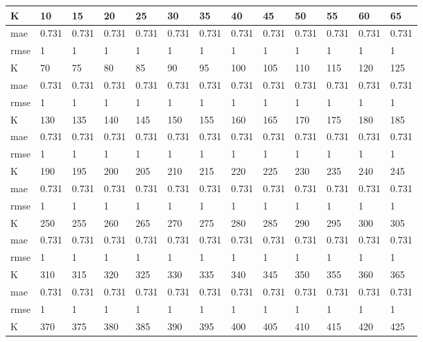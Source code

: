 \begin{appendices}
\begin{center} \label{tab20}
	\begin{tabularx}{\textwidth}{|l|X|X|X|X|X|X|X|X|X|X|X|X|} 
		\hline 
		K & 10 & 15 & 20 & 25 & 30 & 35 & 40 & 45 & 50 & 55 & 60 & 65 \\ \hline 
		mae & 0.731 & 0.731 & 0.731 & 0.731 & 0.731 & 0.731 & 0.731 & 0.731 & 0.731 & 0.731 & 0.731 & 0.731 \\ \hline 
		rmse & 1 & 1 & 1 & 1 & 1 & 1 & 1 & 1 & 1 & 1 & 1 & 1 \\ \hline 
		\hline 
		K & 70 & 75 & 80 & 85 & 90 & 95 & 100 & 105 & 110 & 115 & 120 & 125 \\ \hline 
		mae & 0.731 & 0.731 & 0.731 & 0.731 & 0.731 & 0.731 & 0.731 & 0.731 & 0.731 & 0.731 & 0.731 & 0.731 \\ \hline 
		rmse & 1 & 1 & 1 & 1 & 1 & 1 & 1 & 1 & 1 & 1 & 1 & 1 \\ \hline 
		\hline 
		K & 130 & 135 & 140 & 145 & 150 & 155 & 160 & 165 & 170 & 175 & 180 & 185 \\ \hline 
		mae & 0.731 & 0.731 & 0.731 & 0.731 & 0.731 & 0.731 & 0.731 & 0.731 & 0.731 & 0.731 & 0.731 & 0.731 \\ \hline 
		rmse & 1 & 1 & 1 & 1 & 1 & 1 & 1 & 1 & 1 & 1 & 1 & 1 \\ \hline 
		\hline 
		K & 190 & 195 & 200 & 205 & 210 & 215 & 220 & 225 & 230 & 235 & 240 & 245 \\ \hline 
		mae & 0.731 & 0.731 & 0.731 & 0.731 & 0.731 & 0.731 & 0.731 & 0.731 & 0.731 & 0.731 & 0.731 & 0.731 \\ \hline 
		rmse & 1 & 1 & 1 & 1 & 1 & 1 & 1 & 1 & 1 & 1 & 1 & 1 \\ \hline 
		\hline 
		K & 250 & 255 & 260 & 265 & 270 & 275 & 280 & 285 & 290 & 295 & 300 & 305 \\ \hline 
		mae & 0.731 & 0.731 & 0.731 & 0.731 & 0.731 & 0.731 & 0.731 & 0.731 & 0.731 & 0.731 & 0.731 & 0.731 \\ \hline 
		rmse & 1 & 1 & 1 & 1 & 1 & 1 & 1 & 1 & 1 & 1 & 1 & 1 \\ \hline 
		\hline 
		K & 310 & 315 & 320 & 325 & 330 & 335 & 340 & 345 & 350 & 355 & 360 & 365 \\ \hline 
		mae & 0.731 & 0.731 & 0.731 & 0.731 & 0.731 & 0.731 & 0.731 & 0.731 & 0.731 & 0.731 & 0.731 & 0.731 \\ \hline 
		rmse & 1 & 1 & 1 & 1 & 1 & 1 & 1 & 1 & 1 & 1 & 1 & 1 \\ \hline 
		\hline 
		K & 370 & 375 & 380 & 385 & 390 & 395 & 400 & 405 & 410 & 415 & 420 & 425 \\ \hline 

\end{tabularx}
\end{center}
\end{appendices}
